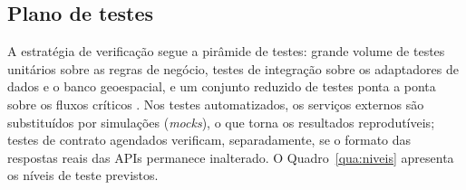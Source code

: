 \subsection{Plano de testes}

A estratégia de verificação segue a pirâmide de testes: grande volume de testes unitários sobre as regras de negócio, testes de integração sobre os adaptadores de dados e o banco geoespacial, e um conjunto reduzido de testes ponta a ponta sobre os fluxos críticos \cite{pressman2021}. Nos testes automatizados, os serviços externos são substituídos por simulações (\emph{mocks}), o que torna os resultados reprodutíveis; testes de contrato agendados verificam, separadamente, se o formato das respostas reais das APIs permanece inalterado. O Quadro~\ref{qua:niveis} apresenta os níveis de teste previstos.

